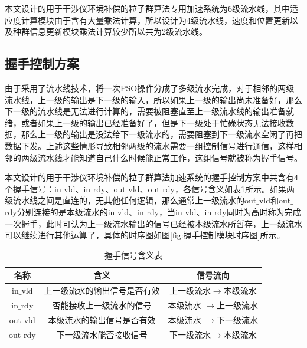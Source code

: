 本文设计的用于干涉仪环境补偿的粒子群算法专用加速系统为6级流水线，其中适应度计算模块由于含有大量乘法计算，所以设计为4级流水线，速度和位置更新以及种群信息更新模块乘法计算较少所以共为2级流水线。

\subsection{握手控制方案}
\label{握手控制方案}
由于采用了流水线技术，将一次PSO操作分成了多级流水完成，对于相邻的两级流水线，上一级的输出是下一级的输入，所以如果上一级的输出尚未准备好，那么下一级的流水线是无法进行计算的，需要被阻塞直至上一级流水线的输出准备就绪，或者如果上一级的输出已经准备好了，但是下一级处于忙碌状态无法接收数据，那么上一级的输出是没法给下一级流水的，需要阻塞到下一级流水空闲了再把数据下发。上述这些情形导致相邻两级的流水需要一组控制信号进行通信，这样相邻的两级流水线才能知道自己什么时候能正常工作，这组信号就被称为握手信号。

本文设计的用于干涉仪环境补偿的粒子群算法加速系统的握手控制方案中共含有4个握手信号：in$\_$vld、in$\_$rdy、out$\_$vld、out$\_$rdy，各信号含义如表\ref{tab:握手信号含义表}所示。如果两级流水线之间是直连的，无其他任何逻辑，那么通常上一级流水的out$\_$vld和out$\_$rdy分别连接的是本级流水的in$\_$vld、in$\_$rdy，当in$\_$vld、in$\_$rdy同时为高时称为完成一次握手，此时可认为上一级流水输出的信号已经被本级流水所暂存，上一级流水可以继续进行其他运算了，具体的时序图如图\ref{fig:握手控制模块时序图}所示。
\begin{table}[H]
    \centering
    \caption{握手信号含义表}
    \label{tab:握手信号含义表}
    \begin{tabular}{c|c|c}
        \hline
        名称                               & 含义                   &  信号流向         \\ \hline
        in$\_$vld              & 上一级流水的输出信号是否有效           &上一级流水$\rightarrow$本级流水        \\ \hline
        in$\_$rdy              & 否能接收上一级流水的信号              &本级流水  $\rightarrow$上一级流水       \\ \hline
        out$\_$vld             & 本级流水的输出信号是否有效            & 本级流水 $\rightarrow$下一级流水       \\ \hline
        out$\_$rdy             & 下一级流水能否接收信号                & 下一级流水$\rightarrow$本级流水       \\ \hline
    \end{tabular}
  \end{table}

